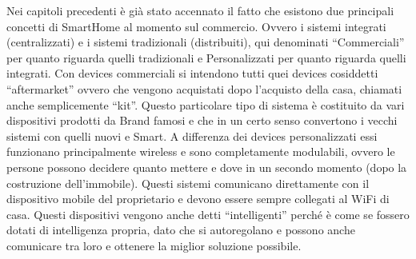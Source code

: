 Nei capitoli precedenti è già stato accennato il fatto che esistono due principali concetti di SmartHome al momento sul commercio. Ovvero i sistemi integrati (centralizzati) e i sistemi tradizionali (distribuiti), qui denominati “Commerciali” per quanto riguarda quelli tradizionali e Personalizzati per quanto riguarda quelli integrati. 
Con devices commerciali si intendono tutti quei devices cosiddetti “aftermarket” ovvero che vengono acquistati dopo l’acquisto della casa, chiamati anche semplicemente “kit”. Questo particolare tipo di sistema è costituito da vari dispositivi prodotti da Brand famosi e che in un certo senso convertono i vecchi sistemi con quelli nuovi e Smart. 
A differenza dei devices personalizzati essi funzionano principalmente wireless e sono completamente modulabili, ovvero le persone possono decidere quanto mettere e dove in un secondo momento (dopo la costruzione dell’immobile). Questi sistemi comunicano direttamente con il dispositivo mobile del proprietario e devono essere sempre collegati al WiFi di casa. Questi dispositivi vengono anche detti “intelligenti” perché è come se fossero dotati di intelligenza propria, dato che si autoregolano e possono anche comunicare tra loro e ottenere la miglior soluzione possibile.
 
